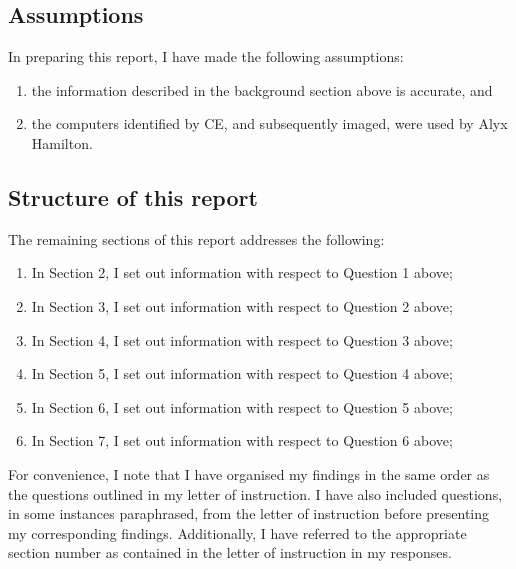 
\subsection{Assumptions} %
\begin{myenum}
     
     \item In preparing this report, I have made the following assumptions:
         \begin{enumerate}
            \item the information described in the background section above is accurate, and 
            \item the computers identified by CE, and subsequently imaged, were used by Alyx Hamilton.
         \end{enumerate}
\end{myenum}
\label{sub:assumptions}


\subsection{Structure of this report} %
\begin{myenum}
     \item The remaining sections of this report addresses the following:
         \begin{enumerate}
            \item In Section 2, I set out information with respect to Question 1 above;
            \item In Section 3, I set out information with respect to Question 2 above;
            \item In Section 4, I set out information with respect to Question 3 above;
            \item In Section 5, I set out information with respect to Question 4 above;
            \item In Section 6, I set out information with respect to Question 5 above;
            \item In Section 7, I set out information with respect to Question 6 above;
         \end{enumerate}
     \item For convenience, I note that I have organised my findings in the same order as the questions outlined in my letter of instruction. I have also included questions, in some instances paraphrased, from the letter of instruction before presenting my corresponding findings. Additionally, I have referred to the appropriate section number as contained in the letter of instruction in my responses.
\end{myenum}
\label{sub:structure_of_this_report}

